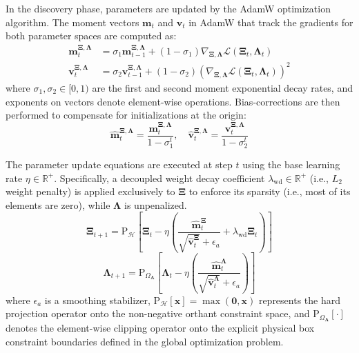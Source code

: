 \documentclass[lettersize,journal]{IEEEtran}
\begin{document}
In the discovery phase, parameters are updated by the AdamW optimization algorithm. The moment vectors $\mathbf{m}_t$ and $\mathbf{v}_t$ in AdamW that track the gradients for both parameter spaces are computed as:  
\begin{equation}
\begin{aligned}
    \mathbf{m}_t^{\boldsymbol{\Xi,\Lambda}} & = \sigma_1 \mathbf{m}_{t-1}^{\boldsymbol{\Xi,\Lambda}} + (1 - \sigma_1)\nabla_{\boldsymbol{\Xi,\Lambda}} \mathcal{L}(\boldsymbol{\Xi}_t, \boldsymbol{\Lambda}_t) \\
    \mathbf{v}_t^{\boldsymbol{\Xi,\Lambda}} & = \sigma_2 \mathbf{v}_{t-1}^{\boldsymbol{\Xi,\Lambda}} + (1 - \sigma_2)(\nabla_{\boldsymbol{\Xi,\Lambda}} \mathcal{L}(\boldsymbol{\Xi}_t, \boldsymbol{\Lambda}_t))^2
\end{aligned}    
\end{equation}
where $\sigma_1, \sigma_2 \in [0, 1)$ are the first and second moment exponential decay rates, and exponents on vectors denote element-wise operations. Bias-corrections are then performed to compensate for initializations at the origin:
\begin{equation}
    \hat{\mathbf{m}}_t^{\boldsymbol{\Xi,\Lambda}} = \frac{\mathbf{m}_t^{\boldsymbol{\Xi,\Lambda}}}{1 - \sigma_1^t}, \quad \hat{\mathbf{v}}_t^{\boldsymbol{\Xi,\Lambda}} = \frac{\mathbf{v}_t^{\boldsymbol{\Xi,\Lambda}}}{1 - \sigma_2^t}
\end{equation}

The parameter update equations are executed at step $t$ using the base learning rate $\eta \in \mathbb{R}^+$. Specifically, a decoupled weight decay coefficient $\lambda_{\text{wd}} \in \mathbb{R}^+$ (i.e., $L_2$ weight penalty) is applied exclusively to $\boldsymbol{\Xi}$ to enforce its sparsity (i.e., most of its elements are zero), while $\boldsymbol{\Lambda}$ is unpenalized.
\begin{equation}
    \boldsymbol{\Xi}_{t+1} = \text{P}_{\mathcal{H}} \left[ \boldsymbol{\Xi}_t - \eta \left( \frac{\hat{\mathbf{m}}_t^{\boldsymbol{\Xi}}}{\sqrt{\hat{\mathbf{v}}_t^{\boldsymbol{\Xi}}} + \epsilon_a} + \lambda_{\text{wd}} \boldsymbol{\Xi}_t \right) \right]
\end{equation}
\begin{equation}
    \boldsymbol{\Lambda}_{t+1} = \text{P}_{\Omega_{\boldsymbol{\Lambda}}} \left[ \boldsymbol{\Lambda}_t - \eta \left( \frac{\hat{\mathbf{m}}_t^{\boldsymbol{\Lambda}}}{\sqrt{\hat{\mathbf{v}}_t^{\boldsymbol{\Lambda}}} + \epsilon_a} \right) \right]
\end{equation}
where $\epsilon_a$ is a smoothing stabilizer, $\text{P}_{\mathcal{H}}[\mathbf{x}] = \max(\mathbf{0}, \mathbf{x})$ represents the hard projection operator onto the non-negative orthant constraint space, and $\text{P}_{\Omega_{\boldsymbol{\Lambda}}}[\cdot]$ denotes the element-wise clipping operator onto the explicit physical box constraint boundaries defined in the global optimization problem.
\end{document}
